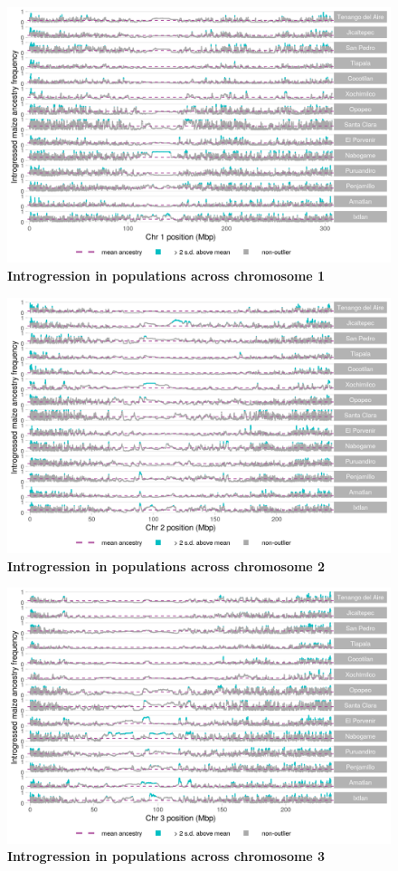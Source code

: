 \begin{figure}[ht]
\includegraphics[width=.85\textwidth]{chapter2/figures/mexicana_shared_outliers_chr_1.png}
\caption{\color{Gray} \textbf{Introgression in \mexicana populations across chromosome 1}}
\label{mexicana_chr1}
\end{figure}

\begin{figure}[ht]
\includegraphics[width=.85\textwidth]{chapter2/figures/mexicana_shared_outliers_chr_2.png}
\caption{\color{Gray} \textbf{Introgression in \mexicana populations across chromosome 2}}
\label{mexicana_chr2}
\end{figure}

\begin{figure}[ht]
\includegraphics[width=.85\textwidth]{chapter2/figures/mexicana_shared_outliers_chr_3.png}
\caption{\color{Gray} \textbf{Introgression in \mexicana populations across chromosome 3}}
\label{mexicana_chr3}
\end{figure}

